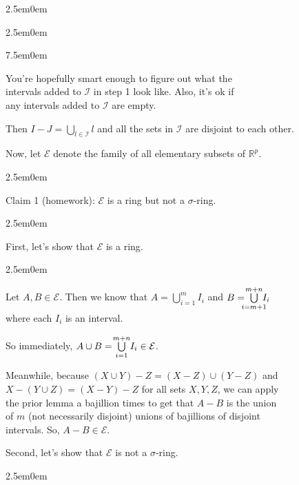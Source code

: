 \documentclass{book}
\newcommand{\exOne}{%
   \color{Purple}%
   \fontsize{14}{16}\selectfont%
}
\newcommand{\exTwo}{%
   \color{RedViolet}%
   \fontsize{13}{15}\selectfont%
}
\newcommand{\exP}{%
   \color{VioletRed}%
   \fontsize{12}{14}\selectfont%
}
\newenvironment{myIndent}{%
   \begin{adjustwidth}{2.5em}{0em}%
}{%
   \end{adjustwidth}%
}
\newenvironment{myTindent}{%
   \begin{adjustwidth}{7.5em}{0em}%
}{%
   \end{adjustwidth}%
}
\newcommand{\retTwo}{\hfill\bigbreak}
\begin{document}
{\begin{myIndent}
{\begin{myIndent}
      \begin{myTindent}\exP
         You're hopefully smart enough to figure out what the\\ intervals added to $\mathcal{I}$ in step 1 look like. Also, it's ok if\\ any intervals added to $\mathcal{I}$ are empty. \retTwo
      \end{myTindent}

      Then $I - J = \bigcup\limits_{l  \in \mathcal{I}} l$ and all the sets in $\mathcal{I}$ are disjoint to each other.\retTwo
   \end{myIndent}}
\end{myIndent}}

Now, let $\mathcal{E}$ denote the family of all elementary subsets of $\mathbb{R}^p$.\\ [-10pt]
{\begin{myIndent}\exOne
   Claim 1 (homework): $\mathcal{E}$ is a ring but not a $\sigma$-ring.
   
   {\begin{myIndent}\exTwo
      First, let's show that $\mathcal{E}$ is a ring.\\ [-21pt]
      \begin{myIndent}
         Let $A, B \in \mathcal{E}$. Then we know that $A = \bigcup\limits_{i=1}^m I_i$ and $B = \hspace{-0.6em}\bigcup\limits_{i=m+1}^{m+n}\hspace{-0.6em} I_i$\\ [-10pt] where each $I_i$ is an interval.\retTwo

         So immediately, $A \cup B = \hspace{-0.2em}\bigcup\limits_{i=1}^{m+n}\hspace{-0.2em} I_i \in \mathcal{E}$.\retTwo

         Meanwhile, because $(X \cup Y) - Z = (X - Z) \cup (Y - Z)$ and\\ $X - (Y \cup Z) = (X - Y) - Z$  for all sets $X, Y, Z$, we can apply\\ the prior lemma a bajillion times to get that $A - B$ is the union\\ of $m$ (not necessarily disjoint) unions of bajillions of disjoint\\ intervals. So, $A - B \in \mathcal{E}$.
      \end{myIndent}

      \newpage

      Second, let's show that $\mathcal{E}$ is not a $\sigma$-ring.
      \begin{myIndent}


\end{myIndent}
\end{myIndent}}
\end{myIndent}}
\end{document}
